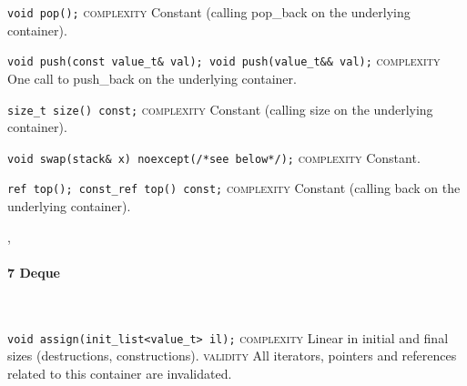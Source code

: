 \noindent{}\hspace*{0.25em}\lstinline[basicstyle=\ttfamily\color{cgreen}]{void pop();} \textsc{complexity} Constant (calling pop\_back on the underlying container).\\\vspace{-0.6em}

\noindent{}\hspace*{0.25em}\lstinline{void push(const value_t& val); void push(value_t&& val);} \textsc{complexity} One call to push\_back on the underlying container.\\\vspace{-0.6em}

\noindent{}\hspace*{0.25em}\lstinline[basicstyle=\ttfamily\color{cgreen}]{size_t size() const;} \textsc{complexity} Constant (calling size on the underlying container).\\\vspace{-0.6em}

\noindent{}\hspace*{0.25em}\lstinline[basicstyle=\ttfamily\color{cgreen}]{void swap(stack& x) noexcept(/*see below*/);} \textsc{complexity} Constant.\\\vspace{-0.6em}

\noindent{}\hspace*{0.25em}\lstinline[basicstyle=\ttfamily\color{cgreen}]{ref top(); const_ref top() const;} \textsc{complexity} Constant (calling back on the underlying container).\\\vspace{-0.6em}


\sep
{}
\paragraph{7 Deque}\mbox{}\vspace{0.5em}\\
\noindent{}\hspace*{0.25em}\lstinline[basicstyle=\ttfamily\color{corange}]{void assign(init_list<value_t> il);} \textsc{complexity} Linear in initial and final sizes (destructions, constructions). \textsc{validity} All iterators, pointers and references related to this container are invalidated.\\\vspace{-0.6em}

